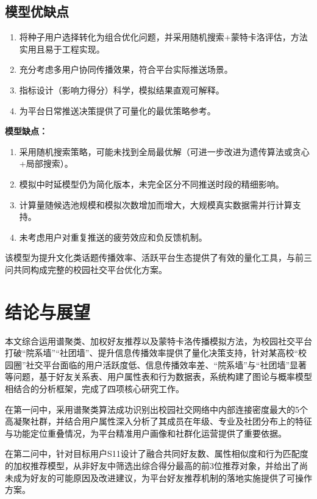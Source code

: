 \documentclass[a4paper,12pt]{ctexart}
\begin{document}
\subsection{模型优缺点}
\begin{enumerate}
    \item 将种子用户选择转化为组合优化问题，并采用随机搜索+蒙特卡洛评估，方法实用且易于工程实现。
    \item 充分考虑多用户协同传播效果，符合平台实际推送场景。
    \item 指标设计（影响力得分）科学，模拟结果直观可解释。
    \item 为平台日常推送决策提供了可量化的最优策略参考。
\end{enumerate}

\textbf{模型缺点：}
\begin{enumerate}
    \item 采用随机搜索策略，可能未找到全局最优解（可进一步改进为遗传算法或贪心+局部搜索）。
    \item 模拟中时延模型仍为简化版本，未完全区分不同推送时段的精细影响。
    \item 计算量随候选池规模和模拟次数增加而增大，大规模真实数据需并行计算支持。
    \item 未考虑用户对重复推送的疲劳效应和负反馈机制。
\end{enumerate}

该模型为提升文化类话题传播效率、活跃平台生态提供了有效的量化工具，与前三问共同构成完整的校园社交平台优化方案。

\section{结论与展望}

本文综合运用谱聚类\cite{ref1}、加权好友推荐\cite{ref2}以及蒙特卡洛传播模拟方法，为校园社交平台打破“院系墙”“社团墙”、提升信息传播效率提供了量化决策支持，针对某高校“校园圈”社交平台面临的用户活跃度低、信息传播效率差、“院系墙”与“社团墙”显著等问题，基于好友关系表、用户属性表和行为数据表，系统构建了图论与概率模型相结合的分析框架，完成了四项核心研究工作。

在第一问中，采用谱聚类算法成功识别出校园社交网络中内部连接密度最大的5个高凝聚社群，并结合用户属性深入分析了其成员在年级、专业及社团分布上的特征与功能定位重叠情况，为平台精准用户画像和社群化运营提供了重要依据。

在第二问中，针对目标用户S11设计了融合共同好友数、属性相似度和行为匹配度的加权推荐模型，从非好友中筛选出综合得分最高的前3位推荐对象，并给出了尚未成为好友的可能原因及改进建议，为平台好友推荐机制的落地实施提供了可操作方案。
\end{document}
